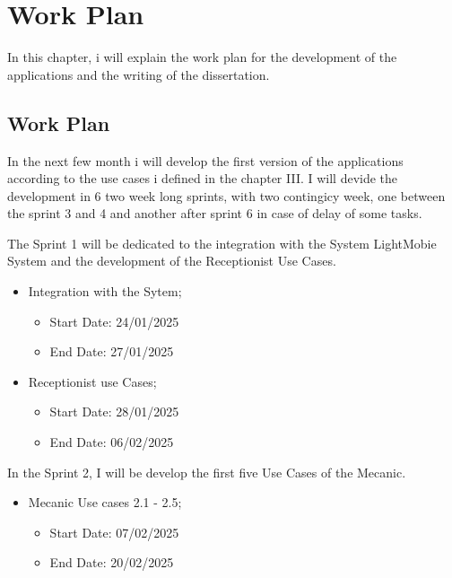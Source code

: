 \chapter{Work Plan}%
\label{chapter:workPlan}

\begin{introduction}
In this chapter, i will explain the work plan for the development of the applications and the writing of the dissertation.
\end{introduction} 


\section{Work Plan}

In the next few month i will develop the first version of the applications according to the use cases i defined in the chapter III. 
I will devide the development in 6 two week long sprints, with two contingicy week, one between the sprint 3 and 4 and another after sprint 6 in case of delay of some tasks.

The Sprint 1 will be dedicated to the integration with the System LightMobie System and the development of the Receptionist Use Cases.  

\begin{itemize}
  \item Integration with the Sytem;
  \begin{itemize}
      \item Start Date: 24/01/2025 
      \item End Date: 27/01/2025 
  \end{itemize}
    \item Receptionist use Cases;
    \begin{itemize}
        \item Start Date: 28/01/2025 
        \item End Date: 06/02/2025 
    \end{itemize}
  \end{itemize}

In the Sprint 2, I will be develop the first five Use Cases of the Mecanic.  

\begin{itemize}
  \item Mecanic Use cases 2.1 - 2.5;
    \begin{itemize}
      \item Start Date: 07/02/2025 
      \item End Date: 20/02/2025 
  \end{itemize}
\end{itemize}

